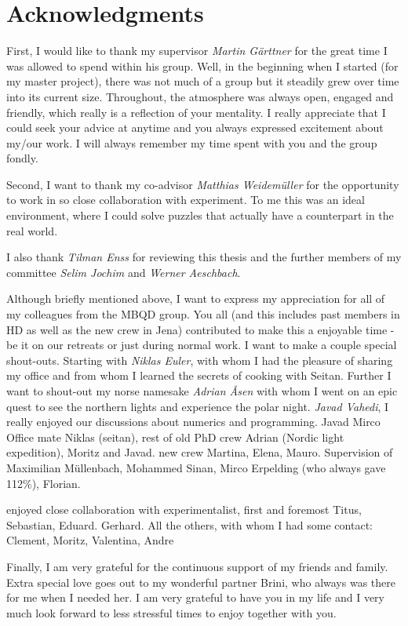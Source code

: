 
\bigskip

\begingroup
\let\clearpage\relax
\let\cleardoublepage\relax
\let\cleardoublepage\relax
\chapter*{Acknowledgments}
First, I would like to thank my supervisor \emph{Martin Gärttner} for the great time I was allowed to spend within his group. Well, in the beginning when I started (for my master project), there was not much of a group but it steadily grew over time into its current size. Throughout, the atmosphere was always open, engaged and friendly, which really is a reflection of your mentality. I really appreciate that I could seek your advice at anytime and you always expressed excitement about my/our work. I will always remember my time spent with you and the group fondly.

Second, I want to thank my co-advisor \emph{Matthias Weidemüller} for the opportunity to work in so close collaboration with experiment. To me this was an ideal environment, where I could solve puzzles that actually have a counterpart in the real world. %

I also thank \emph{Tilman Enss} for reviewing this thesis and the further members of my committee \emph{Selim Jochim} and \emph{Werner Aeschbach}.

Although briefly mentioned above, I want to express my appreciation for all of my colleagues from the MBQD group. You all (and this includes past members in HD as well as the new crew in Jena) contributed to make this a enjoyable time - be it on our retreats or just during normal work.
I want to make a couple special shout-outs. Starting with \emph{Niklas Euler}, with whom I had the pleasure of sharing my office and from whom I learned the secrets of cooking with Seitan. Further I want to shout-out my norse namesake \emph{Adrian \AA sen} with whom I went on an epic quest to see the northern lights and experience the polar night. \emph{Javad Vahedi}, I really enjoyed our discussions about numerics and programming.
Javad
Mirco
Office mate Niklas (seitan), rest of old PhD crew Adrian (Nordic light expedition), Moritz and Javad. new crew Martina, Elena, Mauro. 
Supervision of Maximilian Müllenbach, Mohammed Sinan, Mirco Erpelding (who always gave 112\%), Florian.

enjoyed close collaboration with experimentalist, first and foremost Titus, Sebastian, Eduard. Gerhard. All the others, with whom I had some contact: Clement, Moritz, Valentina, Andre


Finally, I am very grateful for the continuous support of my friends and family. Extra special love goes out to my wonderful partner Brini, who always was there for me when I needed her.
I am very grateful to have you in my life and I very much look forward to less stressful times to enjoy together with you.
\endgroup
